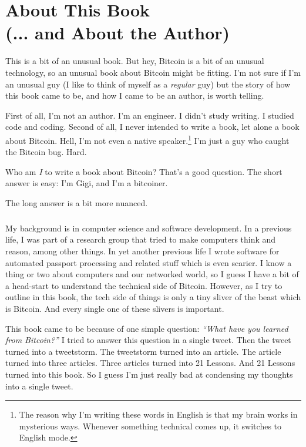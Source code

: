 
\def\bitcoinB{\leavevmode
  {\setbox0=\hbox{\textsf{B}}%
    \dimen0\ht0 \advance\dimen0 0.2ex
    \ooalign{\hfil \box0\hfil\cr
      \hfil\vrule height \dimen0 depth.2ex\hfil\cr
    }%
  }%
}

\chapter*{About This Book \\ (... and About the Author)}

This is a bit of an unusual book. But hey, Bitcoin is a bit of an unusual
technology, so an unusual book about Bitcoin might be fitting. I'm not sure if
I'm an unusual guy (I like to think of myself as a \textit{regular} guy) but the
story of how this book came to be, and how I came to be an author, is worth
telling.

First of all, I'm not an author. I'm an engineer. I didn't study writing. I
studied code and coding. Second of all, I never intended to write a book, let
alone a book about Bitcoin. Hell, I'm not even a native speaker.\footnote{The
reason why I'm writing these words in English is that my brain works in
mysterious ways. Whenever something technical comes up, it switches to English
mode.} I'm just a guy who caught the Bitcoin bug. Hard.

Who am \textit{I} to write a book about Bitcoin? That's a good question. The
short answer is easy: I'm Gigi, and I'm a bitcoiner.

The long answer is a bit more nuanced.

\paragraph{}
My background is in computer science and software development. In a
previous life, I was part of a research group that tried to make computers think
and reason, among other things. In yet another previous life I wrote software
for automated passport processing and related stuff which is even scarier. I
know a thing or two about computers and our networked world, so I guess I have a
bit of a head-start to understand the technical side of Bitcoin. However, as I
try to outline in this book, the tech side of things is only a tiny sliver of
the beast which is Bitcoin. And every single one of these slivers is important.

This book came to be because of one simple question: \textit{\enquote{What have
you learned from Bitcoin?}} I tried to answer this question in a single tweet.
Then the tweet turned into a tweetstorm. The tweetstorm turned into an article.
The article turned into three articles. Three articles turned into 21 Lessons.
And 21 Lessons turned into this book. So I guess I'm just really bad at
condensing my thoughts into a single tweet.

